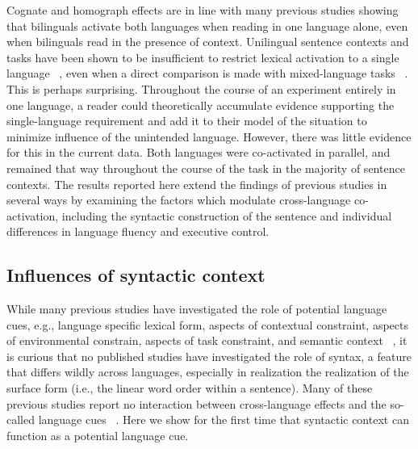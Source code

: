 Cognate and homograph effects are in line with many previous studies showing that bilinguals activate both languages when reading in one language alone, even when bilinguals read in the presence of context. Unilingual sentence contexts and tasks have been shown to be insufficient to restrict lexical activation to a single language ~\citep[e.g.,][]{Schwartz2006}, even when a direct comparison is made with mixed-language tasks ~\citep[e.g.,][]{Gullifer2013}. This is perhaps surprising. Throughout the course of an experiment entirely in one language, a reader could theoretically accumulate evidence supporting the single-language requirement and add it to their model of the situation to minimize influence of the unintended language. However, there was little evidence for this in the current data. Both languages were co-activated in parallel, and remained that way throughout the course of the task in the majority of sentence contexts. The results reported here extend the findings of previous studies in several ways by examining the factors which modulate cross-language co-activation, including the syntactic construction of the sentence and individual differences in language fluency and executive control.

\subsection{Influences of syntactic context}
\label{influencesofsyntacticcontext}

While many previous studies have investigated the role of potential language cues, e.g., language specific lexical form, aspects of contextual constraint, aspects of environmental constrain, aspects of task constraint, and semantic context ~\citep{Duyck2007, Gullifer2013, VanAssche2010,VanAssche2009, Pivneva2014, Lagrou2011, Libben2009, Schwartz2006, Titone2011}, it is curious that no published studies have investigated the role of syntax, a feature that differs wildly across languages, especially in realization the realization of the surface form (i.e., the linear word order within a sentence). Many of these previous studies report no interaction between cross-language effects and the so-called language cues ~\citep{VanAssche2010, Lagrou2011, Gullifer2013}. Here we show for the first time that syntactic context can function as a potential language cue. 

